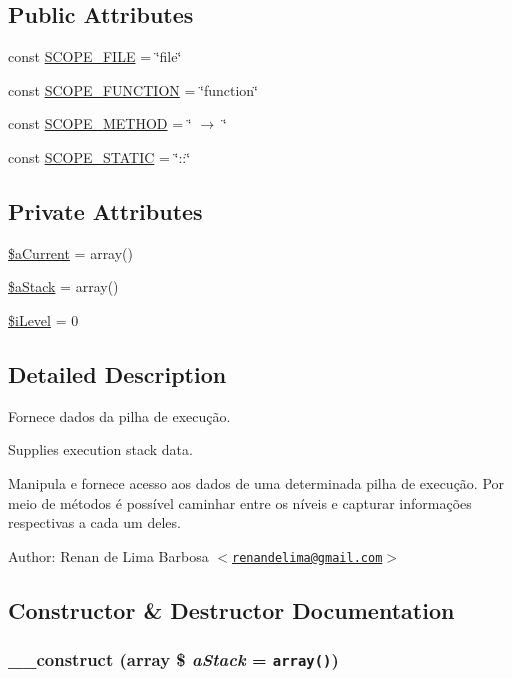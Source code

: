 \subsection*{Public Attributes}
\begin{CompactItemize}
\item 
const \hyperlink{class_back_trace_41001bb7178dc4a269ad6bebebc88da1}{SCOPE\_\-FILE} = \char`\"{}file\char`\"{}
\item 
const \hyperlink{class_back_trace_eea61035bd38b8bdc6b3abc4e387d98f}{SCOPE\_\-FUNCTION} = \char`\"{}function\char`\"{}
\item 
const \hyperlink{class_back_trace_32fd91e8f98ebf2cd2370c1919be0b0d}{SCOPE\_\-METHOD} = \char`\"{} $\rightarrow$ \char`\"{}
\item 
const \hyperlink{class_back_trace_096359905e9cd5f803f8414eea1a713b}{SCOPE\_\-STATIC} = \char`\"{}::\char`\"{}
\end{CompactItemize}
\subsection*{Private Attributes}
\begin{CompactItemize}
\item 
\hyperlink{class_back_trace_92d25322fa24d1675b6331dad400ee1f}{\$aCurrent} = array()
\item 
\hyperlink{class_back_trace_5cb2fde204eda0effb2a17536b7cf962}{\$aStack} = array()
\item 
\hyperlink{class_back_trace_128f1dc665616c26696bdedbea55f312}{\$iLevel} = 0
\end{CompactItemize}


\subsection{Detailed Description}
Fornece dados da pilha de execução.

Supplies execution stack data.

Manipula e fornece acesso aos dados de uma determinada pilha de execução. Por meio de métodos é possível caminhar entre os níveis e capturar informações respectivas a cada um deles.

\begin{Desc}
\item[Author:]Renan de Lima Barbosa $<$\href{mailto:renandelima@gmail.com}{\tt renandelima@gmail.com}$>$ \end{Desc}


\subsection{Constructor \& Destructor Documentation}
\hypertarget{class_back_trace_e81810ff23f1543976f5d3eacbfeeb29}{
\subsubsection[{\_\-\_\-construct}]{\setlength{\rightskip}{0pt plus 5cm}\_\-\_\-construct (array \$ {\em aStack} = {\tt array()})}}
\label{class_back_trace_e81810ff23f1543976f5d3eacbfeeb29}


